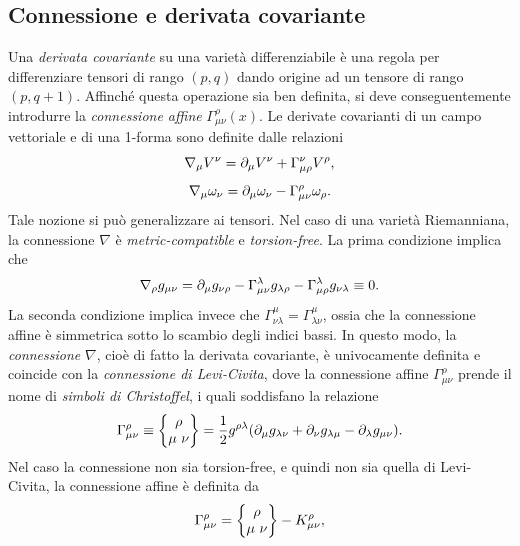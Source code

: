 \subsection{Connessione e derivata covariante}
Una \emph{derivata covariante} su una varietà differenziabile è una regola per differenziare tensori di rango $(p, q)$ dando origine ad un tensore di rango $(p, q + 1)$. Affinché questa operazione sia ben definita, si deve conseguentemente introdurre la \emph{connessione affine} $\Gamma^\rho_{\mu\nu}(x)$. Le derivate covarianti di un campo vettoriale e di una 1-forma sono definite dalle relazioni
\begin{equation}
\label{eq: derivata covariante campo vettoriale}
    \nabla_\mu V^\nu = \partial_\mu V^\nu + \Gamma_{\mu\rho}^\nu V^\rho,
\end{equation}
\begin{equation}
\label{eq: derivata covariante 1-forma}
    \nabla_\mu\omega_\nu = \partial_\mu\omega_\nu - \Gamma^\rho_{\mu\nu}\omega_\rho.
\end{equation}
Tale nozione si può generalizzare ai tensori. Nel caso di una varietà Riemanniana, la connessione $\nabla$ è \emph{metric-compatible} e \emph{torsion-free}. La prima condizione implica che
\begin{equation}
\label{eq: metric postulate}
    \nabla_\rho g_{\mu\nu} = \partial_\mu g_{\nu\rho} - \Gamma^\lambda_{\mu\nu}g_{\lambda\rho} - \Gamma^\lambda_{\mu\rho}g_{\nu\lambda} \equiv 0.
\end{equation}
La seconda condizione implica invece che $\Gamma^\mu_{\nu\lambda} = \Gamma^\mu_{\lambda\nu}$, ossia che la connessione affine è simmetrica sotto lo scambio degli indici bassi. In questo modo, la \emph{connessione} $\nabla$, cioè di fatto la derivata covariante, è univocamente definita e coincide con la \emph{connessione di Levi-Civita}, dove la connessione affine $\Gamma^\rho_{\mu\nu}$ prende il nome di \emph{simboli di Christoffel}, i quali soddisfano la relazione
\begin{equation}
\label{eq: simboli di Christoffel}
    \Gamma^\rho_{\mu\nu} \equiv \left\{ \begin{matrix} \rho \\ \mu\ \nu \end{matrix} \right\} = \frac{1}{2}g^{\rho\lambda}(\partial_\mu g_{\lambda\nu} + \partial_\nu g_{\lambda\mu} - \partial_\lambda g_{\mu\nu}).
\end{equation}
Nel caso la connessione non sia torsion-free, e quindi non sia quella di Levi-Civita, la connessione affine è definita da
\begin{equation}
\label{eq: connessione affine spaziotempo curvo}
    \Gamma^\rho_{\mu\nu} = \left\{ \begin{matrix} \rho \\ \mu\ \nu \end{matrix} \right\} - K^\rho_{\mu\nu},
\end{equation}
